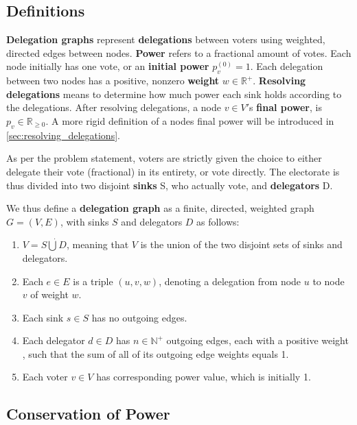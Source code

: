 \subsection{Definitions}

\textbf{Delegation graphs} represent \textbf{delegations} between voters using weighted, directed edges between nodes. \textbf{Power} refers to a fractional amount of votes. Each node initially has one vote, or an \textbf{initial power} $p^{(0)}_v = 1$. Each delegation between two nodes has a positive, nonzero \textbf{weight} $w \in \mathbb{R}^+$. \textbf{Resolving delegations} means to determine how much power each sink holds according to the delegations. After resolving delegations, a node $v \in V'$s \textbf{final power}, is $p_v \in \mathbb{R}_{\ge0}$. A more rigid definition of a nodes final power will be introduced in \cref{sec:resolving_delegations}.

As per the problem statement, voters are strictly given the choice to either delegate their vote (fractional) in its entirety, or vote directly. The electorate is thus divided into two disjoint \textbf{sinks} S, who actually vote, and \textbf{delegators} D. 

We thus define a \textbf{delegation graph} as a finite, directed, weighted graph $G = (V, E)$, with sinks $S$ and delegators $D$ as follows:

\begin{enumerate}
\item $V = S \dot\bigcup D$, meaning that $V$ is the union of the two disjoint sets of sinks and delegators.
\item Each $e \in E$ is a triple $(u, v, w)$, denoting a delegation from node $u$ to node $v$ of weight $w$.
\item Each sink $s \in S$ has no outgoing edges.
\item Each delegator $d \in D$ has $n \in \mathbb{N}^+$ outgoing edges, each with a positive weight \footnotemark, such that the sum of all of its outgoing edge weights equals 1.
\item Each voter $v \in V$ has corresponding power value, which is initially 1.
\end{enumerate}


 \subsection{Conservation of Power}
 
